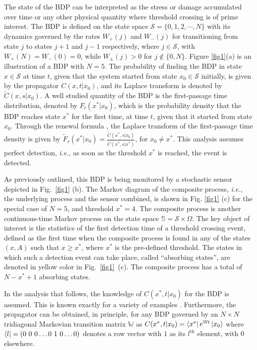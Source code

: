 The state of the BDP can be interpreted as the stress or damage accumulated over time or any other physical 
quantity where threshold crossing is of prime interest. The BDP is defined on the state space $\mathcal{S} = \{0,1,2,\cdots,N\}$ with its dynamics 
governed by the rates  $W_{+}(j)$ and  $W_{-}(j)$ for transitioning from state $j$ to states $j+1$ and $j-1$ respectively, where $j \in \mathcal{S}$, with $W_{+}(N)=W_{-}(0)=0$, while $W_{\pm}(j)>0$ for $j \notin \{0,N\}$. Figure \ref{fig1}(a) is an illustration of a BDP with $N=5$.
The probability of finding the BDP in state $x \in \mathcal{S}$ at time $t$, given that the 
system started from state $x_0\in\mathcal{S}$ initially, is given by the propagator $C(x,t|x_0)$, and its Laplace transform is denoted by $\widetilde{C}(x,s|x_0)$. A well studied quantity of the BDP is the first-passage time distribution, denoted by $F_{t}(x^*|x_0)$, which is the probability density that the BDP reaches state $x^*$ for the first time, at time $t$, given that it started from state $x_0$. Through the renewal formula \cite{redner2001}, the Laplace transform of the first-passage time density is given by
$\widetilde{F}_{s}(x^*|x_0)=\frac{\widetilde{C}(x^*,s|x_0)}{\widetilde{C}(x^*,s|x^*)}$, for $x_0 \neq x^*$. This analysis assumes perfect detection, {\it i.e.}, as soon as the threshold $x^*$ is reached, the event is detected.  

As previously outlined, this BDP is being monitored by a stochastic sensor depicted in Fig.~\ref{fig1} (b). The Markov diagram of the composite process, {\it i.e.}, the underlying process and the sensor combined, is shown in Fig. \ref{fig1} (c) for the special case of $N=5$, and threshold $x^*=4$. The composite process is another continuous-time Markov process on the state space $\mathbb{S}=\mathcal{S}\times\Omega$. The key object of interest is the statistics of the first detection time of a threshold crossing event, defined as the first time when the composite process is found in any of the states $(x,A)$ such that $x \geq x^*$, where $x^*$ is the pre-defined threshold. The states in which such a detection event can take place, called ``absorbing states'', are denoted in yellow color in Fig.~\ref{fig1}~(c). The composite process has a total of $N-x^*+1$ absorbing states. 

In the analysis that follows, the knowledge of $C(x^*,t|x_0)$ for the BDP is assumed. This is known exactly for a variety of examples \citep{parthasarathy_exact_2006,sasaki_exactly_2009,crawford_transition_2012}. Furthermore, the propagator can be obtained, in principle, for any BDP governed by an $N \times N$ tridiagonal Markovian transition matrix $\mathbb{W}$ as $C(x^*,t|x_0) = \bra{x^*}e^{\mathbb{W}t}\ket{x_0}$
where $\bra{l} = ( 0 ~0 ~0 \dots 0 ~1 ~0 \dots 0)$ denotes a row vector with $1$ as its  $l^\textrm{th}$ element, with $0$ elsewhere.

